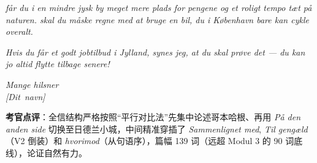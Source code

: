 \begin{answerbox}
\textit{ får du i en mindre jysk by meget mere plads for pengene og et roligt tempo tæt på naturen.  skal du måske regne med at bruge en bil,  du i København bare kan cykle overalt.}

\textit{Hvis du får et godt jobtilbud i Jylland, synes jeg, at du skal prøve det --- du kan jo altid flytte tilbage senere!}

\textit{Mange hilsner\\
\mbox{[Dit navn]}}

\small\textbf{考官点评}：全信结构严格按照“平行对比法”先集中论述哥本哈根、再用 \textit{På den anden side} 切换至日德兰小城，中间精准穿插了 \textit{Sammenlignet med}, \textit{Til gengæld}（V2 倒装）和 \textit{hvorimod}（从句语序），篇幅 139 词（远超 Modul 3 的 90 词底线），论证自然有力。
\end{answerbox}
